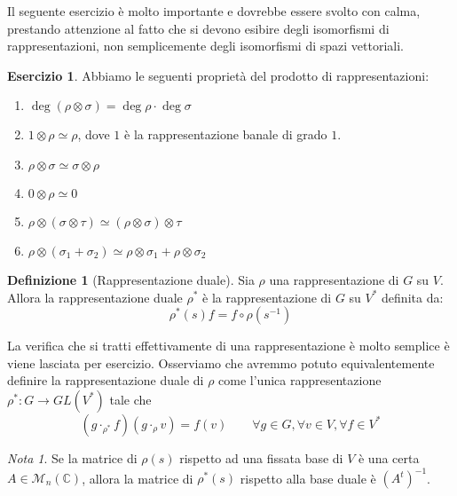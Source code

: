 \documentclass[11pt]{article}
\theoremstyle{plain}
\theoremstyle{definition}
\newtheorem{defn}{Definizione}[section]
\newtheorem{exercise}{Esercizio}[section]
\theoremstyle{remark}
\newtheorem*{note}{Nota}
\newcommand{\C}{\mathbb{C}}
\newcommand{\matrices}{\mathcal{M}}
\DeclareMathOperator{\iso}{\simeq}
\begin{document}
Il seguente esercizio è molto importante e dovrebbe essere svolto con calma, prestando attenzione al fatto
che si devono esibire degli isomorfismi di rappresentazioni, non semplicemente degli isomorfismi di spazi vettoriali.
\begin{exercise}
Abbiamo le seguenti proprietà del prodotto di rappresentazioni:
\begin{enumerate}
\item $\deg(\rho\otimes\sigma) = \deg\rho \cdot \deg\sigma$
\item $1\otimes \rho \iso \rho$, dove $1$ è la rappresentazione banale di grado $1$.
\item $\rho \otimes \sigma \iso \sigma \otimes \rho$
\item $0 \otimes \rho \iso 0$
\item $\rho \otimes (\sigma \otimes \tau) \iso (\rho \otimes \sigma)\otimes \tau$
\item $\rho \otimes (\sigma_1 + \sigma_2) \iso \rho \otimes \sigma_1 + \rho \otimes \sigma_2$
\end{enumerate}
\end{exercise}




\begin{defn}[Rappresentazione duale]
\label{defn:rappresentazione duale}
Sia $\rho$ una rappresentazione di $G$ su $V$. Allora la rappresentazione duale $\rho^*$ è la rappresentazione di $G$ su $V^*$ definita da:
\[\rho^*(s)f=f\circ \rho(s^{-1}) \]
\end{defn}
La verifica che si tratti effettivamente di una rappresentazione è molto semplice è viene lasciata per esercizio.
Osserviamo che avremmo potuto equivalentemente definire la rappresentazione duale di $\rho$ come l'unica rappresentazione $\rho^*:G\to GL(V^*)$ tale che
\[ (g\cdot_{\rho^*}f)(g\cdot_\rho v)=f(v) \qquad \forall g\in G,\forall v\in V,\forall f\in V^*\]

\begin{note}
Se la matrice di $\rho(s)$ rispetto ad una fissata base di $V$ è una certa $A\in\matrices_n(\C)$, allora la matrice di $\rho^*(s)$ rispetto alla base duale
è $(A^t)^{-1}$.
\end{note}
\end{document}
